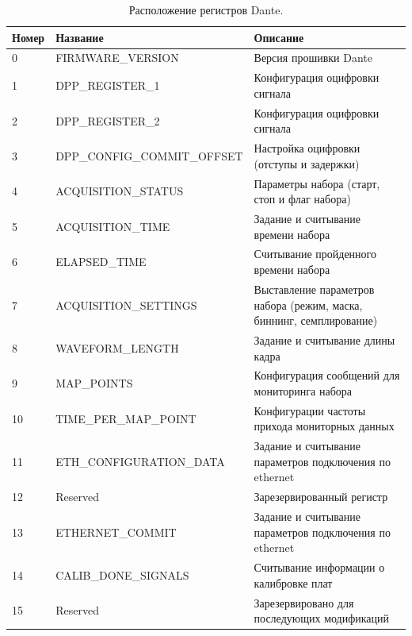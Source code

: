 \documentclass[a4paper,14pt]{extreport}
\begin{document}
\begin{table}
    \centering
    \begin{adjustbox}{width=\textwidth}
        \begin{tabular}{|l|l|l|}
        \hline
        Номер & Название & Описание \\
        \hline
        0 & FIRMWARE\_VERSION & Версия прошивки Dante \\
        \hline
        1 & DPP\_REGISTER\_1 & Конфигурация оцифровки сигнала \\
        \hline
        2 & DPP\_REGISTER\_2 & Конфигурация оцифровки сигнала \\
        \hline
        3 & DPP\_CONFIG\_COMMIT\_OFFSET & Настройка оцифровки (отступы и задержки) \\
        \hline
        4 & ACQUISITION\_STATUS & Параметры набора (старт, стоп и флаг набора) \\
        \hline
        5 & ACQUISITION\_TIME & Задание и считывание времени набора \\
        \hline
        6 & ELAPSED\_TIME & Считывание пройденного времени набора \\
        \hline
        7 & ACQUISITION\_SETTINGS & Выставление параметров набора (режим, маска, биннинг, семплирование) \\
        \hline
        8 & WAVEFORM\_LENGTH & Задание и считывание длины кадра \\
        \hline
        9 & MAP\_POINTS & Конфигурация сообщений для мониторинга набора \\
        \hline
        10 & TIME\_PER\_MAP\_POINT & Конфигурации частоты прихода мониторных данных \\
        \hline
        11 & ETH\_CONFIGURATION\_DATA & Задание и считывание параметров подключения по ethernet \\
        \hline
        12 & Reserved & Зарезервированный регистр \\
        \hline
        13 & ETHERNET\_COMMIT & Задание и считывание параметров подключения по ethernet \\
        \hline
        14 & CALIB\_DONE\_SIGNALS & Считывание информации о калибровке плат \\
        \hline
        15 & Reserved & Зарезервировано для последующих модификаций \\
        \hline
        \end{tabular} 
    \end{adjustbox}
    \caption{Расположение регистров Dante.}
    \label{tab:dante-regissters}
\end{table}
\end{document}
